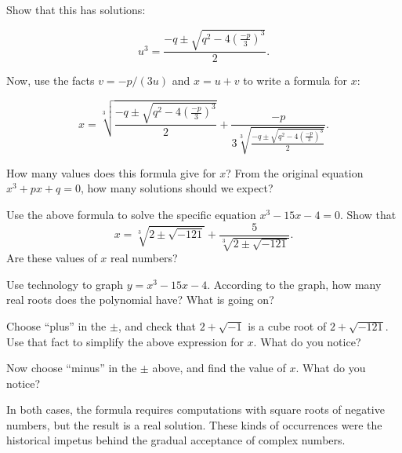 Show that this has solutions: 

$$u^3 = \frac{-q\pm\sqrt{q^2-4\left( \frac{-p}{3}\right)^3}}{2}.$$

Now, use the facts $v= -p/(3u)$ and $x = u + v$ to write a formula for $x$: 

$$x = \sqrt[3]{\frac{-q\pm\sqrt{q^2-4\left( \frac{-p}{3}\right)^3}}{2}} 
+  \frac{-p}{3\sqrt[3]{\frac{-q\pm\sqrt{q^2-4\left( \frac{-p}{3}\right)^3}}{2}}}.$$

\begin{prob}
How many values does this formula give for $x$?  From the original equation $x^3+px+q=0$, how many solutions should we expect? 
\end{prob}
\vfill

\begin{prob}
Use the above formula to solve the specific equation $x^3-15x-4=0$.  Show that $$x = \sqrt[3]{2 \pm \sqrt{-121}} + \frac{5}{\sqrt[3]{2\pm\sqrt{-121}}}.$$
Are these values of $x$ real numbers?  
\end{prob}
\vfill


\begin{prob}
Use technology to graph $y=x^3-15x-4$.  According to the graph, how many real roots does the polynomial have?  What is going on?  
\end{prob}
\vfill

\begin{prob}
Choose ``plus'' in the $\pm$, and check that $2+\sqrt{-1}$ is a cube root of $2 + \sqrt{-121}$.  Use that fact to simplify the above expression for $x$.  What do you notice?  
\end{prob}
\vfill

\begin{prob}
Now choose ``minus'' in the $\pm$ above, and find the value of $x$.  What do you notice?  
\end{prob}

\vfill
In both cases, the formula requires computations with square roots of negative numbers, but the result is a real solution.  These kinds of occurrences were the historical impetus behind the gradual acceptance of complex numbers.  

